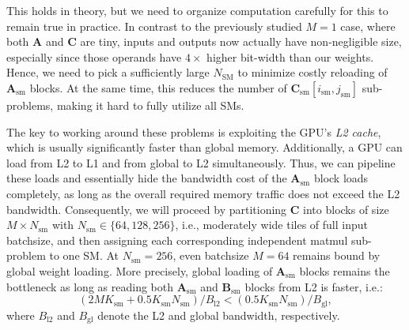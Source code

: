 \documentclass{article}
\theoremstyle{plain}
\theoremstyle{definition}
\theoremstyle{remark}
\newcommand{\htor}[1]{\textcolor{green}{[htor: #1]}}
\begin{document}
This holds in theory, but we need to organize computation carefully for this to remain true in practice. In contrast to the previously studied \cite{frantar2022gptq, dettmers2022case} $M = 1$ case, where both $\mathbf{A}$ and $\mathbf{C}$ are tiny, inputs and outputs now actually have non-negligible size, especially since those operands have $4\times$ higher bit-width than our weights. Hence, we need to pick a sufficiently large $N_\text{SM}$ to minimize costly reloading of $\mathbf{A}_\text{sm}$ blocks. At the same time, this reduces the number of $\mathbf{C}_\text{sm}[i_\text{sm}, j_\text{sm}]$ sub-problems, making it hard to fully utilize all SMs.

The key to working around these problems is exploiting the GPU's \emph{L2 cache}, which is usually significantly faster than global memory. Additionally, a GPU can load from L2 to L1 and from global to L2 simultaneously. Thus, we can pipeline these loads and essentially hide the bandwidth cost of the $\mathbf{A}_\text{sm}$ block loads completely, as long as the overall required memory traffic does not exceed the L2 bandwidth. Consequently, we will proceed by partitioning $\mathbf{C}$ into blocks of size $M \times N_\text{sm}$ with $N_\text{sm} \in \{64, 128, 256\}$, i.e., moderately wide tiles of full input batchsize, and then assigning each corresponding independent matmul sub-problem to one SM. At $N_\text{sm} = 256$, even batchsize $M = 64$ remains bound by global weight loading. More precisely, global loading of $\mathbf{A}_\text{sm}$ blocks remains the bottleneck as long as reading both $\mathbf{A}_\text{sm}$ and $\mathbf{B}_\text{sm}$ blocks from L2 is faster, i.e.:
\begin{equation}
    (2 M K_\text{sm} + 0.5 K_\text{sm} N_\text{sm}) / B_\text{l2} < (0.5 K_\text{sm} N_\text{sm}) / B_\text{gl},
\end{equation}
where $B_\text{l2}$ and $B_\text{gl}$ denote the L2 and global bandwidth, respectively.


\end{document}
